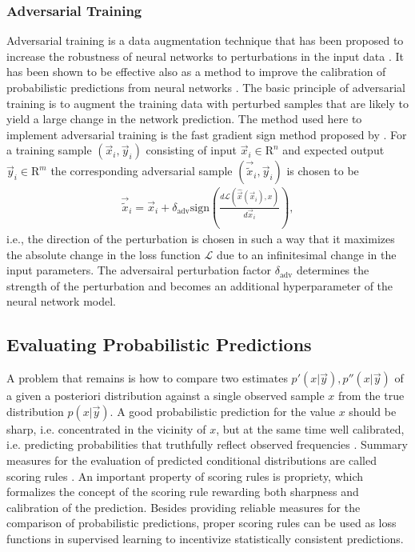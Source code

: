 \documentclass[journal abbreviation, manuscript]{copernicus}
\begin{document}
\subsubsection{Adversarial Training}
\label{sec:adversarial_training}

  Adversarial training is a data augmentation technique that has been proposed
  to increase the robustness of neural networks to perturbations in the input
  data \citep{goodfellow_2}. It has been shown to be effective also as a method
  to improve the calibration of probabilistic predictions from neural networks
  \citep{lakshminarayanan}. The basic principle of adversarial training is to
  augment the training data with perturbed samples that are likely to
  yield a large change in the network prediction. The method used here to
  implement adversarial training  is the fast gradient sign method
  proposed by \citet{goodfellow_2}. For a training sample $(\vec{x}_i, \vec{y}_i)$
  consisting of input $\vec{x}_i \in \mathrm{R}^{n}$ and expected output
  $\vec{y}_i \in \mathrm{R}^m$ the corresponding adversarial sample
  $(\vec{\tilde{x}}_i, \vec{y}_i)$ is chosen to be
    \begin{align}\label{eq:adversarial_training}
      \vec{\tilde{x}}_i = \vec{x}_i + \delta_\text{adv} \text{sign} \left (
     \frac{d \mathcal{L}(\hat{\vec{x}}(\vec{x}_i), x)}{d\vec{x}_i}
      \right ),
    \end{align}
    i.e., the direction of the perturbation is chosen in such a way that
    it maximizes the absolute change in the loss function $\mathcal{L}$ due
    to an infinitesimal change in the input parameters. The adversairal
    perturbation factor $\delta_{\text{adv}}$ determines the strength of the perturbation
    and becomes an additional hyperparameter of the neural network model.

\subsection{Evaluating Probabilistic Predictions}

A problem that remains is how to compare two estimates $p'(x | \vec{y}), p''(x
| \vec{y})$ of a given a posteriori distribution against a single observed sample
$x$ from the true distribution $p(x | \vec{y})$. A good
probabilistic prediction for the value $x$ should be sharp, i.e. concentrated in
the vicinity of $x$, but at the same time well calibrated, i.e. predicting
probabilities that truthfully reflect observed frequencies \citep{gneiting_2}.
Summary measures for the evaluation of predicted conditional distributions are
called scoring rules \citep{gneiting}. An important property of scoring rules
is propriety, which formalizes the concept of the scoring rule rewarding both
sharpness and calibration of the prediction. Besides providing reliable
measures for the comparison of probabilistic predictions, proper scoring rules
can be used as loss functions in supervised learning to incentivize
statistically consistent predictions.
\end{document}
